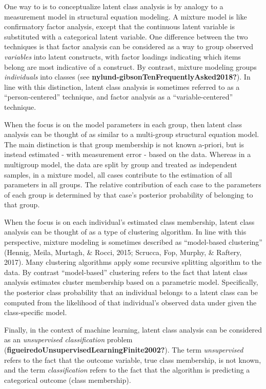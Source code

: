 \documentclass[
  ,man]{apa6}
\begin{document}
One way to is to conceptualize latent class analysis is by analogy to a measurement model in structural equation modeling.
A mixture model is like confirmatory factor analysis, except that the continuous latent variable is substituted with a categorical latent variable.
One difference between the two techniques is that factor analysis can be considered as a way to group observed \emph{variables} into latent constructs, with factor loadings indicating which items belong are most indicative of a construct.
By contrast, mixture modeling groups \emph{individuals} into classes (see \textbf{nylund-gibsonTenFrequentlyAsked2018?}).
In line with this distinction, latent class analysis is sometimes referred to as a ``person-centered'' technique, and factor analysis as a ``variable-centered'' technique.

When the focus is on the model parameters in each group,
then latent class analysis can be thought of as similar to a multi-group structural equation model.
The main distinction is that group membership is not known a-priori,
but is instead estimated - with measurement error - based on the data.
Whereas in a multigroup model, the data are split by group and treated as independent samples,
in a mixture model, all cases contribute to the estimation of all parameters in all groups.
The relative contribution of each case to the parameters of each group is determined by that case's posterior probability of belonging to that group.

When the focus is on each individual's estimated class membership,
latent class analysis can be thought of as a type of clustering algorithm.
In line with this perspective, mixture modeling is sometimes described as ``model-based
clustering'' (Hennig, Meila, Murtagh, \& Rocci, 2015; Scrucca, Fop, Murphy, \&
Raftery, 2017).
Many clustering algorithms apply some recursive splitting algorithm to the data.
By contrast ``model-based'' clustering refers to the fact that latent class analysis
estimates cluster membership based on a parametric model.
Specifically, the posterior class probability that an individual belongs to a latent class
can be computed from the likelihood of that individual's observed data under given the class-specific model.

Finally, in the context of machine learning, latent class analysis can be considered as an
\emph{unsupervised classification} problem (\textbf{figueiredoUnsupervisedLearningFinite2002?}).
The term \emph{unsupervised} refers to the fact that the outcome variable, true class membership,
is not known, and the term \emph{classification} refers to the fact that the algorithm is predicting a categorical outcome (class membership).
\end{document}
